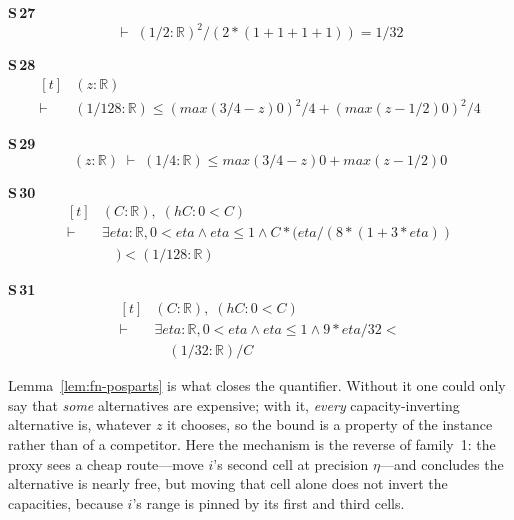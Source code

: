 \noindent\textbf{S\,27}\quad{}
{\footnotesize\[ \vdash\; (1/2 : \mathbb{R} ) ^{2} / (2 * (1 + 1 + 1 + 1)) = 1 / 32 \]}

\noindent\textbf{S\,28}\quad{}
{\footnotesize\[ \begin{aligned}[t]
&(\mathit{z} : \mathbb{R} )\\
\vdash\;&(1/128 : \mathbb{R} ) \leq (\mathit{max} (3/4 - \mathit{z}) 0) ^{2} / 4 + (\mathit{max} (\mathit{z} - 1/2) 0) ^{2} / 4
\end{aligned} \]}

\noindent\textbf{S\,29}\quad{}
{\footnotesize\[ (\mathit{z} : \mathbb{R} ) \;\vdash\; (1/4 : \mathbb{R} ) \leq \mathit{max} (3/4 - \mathit{z}) 0 + \mathit{max} (\mathit{z} - 1/2) 0 \]}

\noindent\textbf{S\,30}\quad{}
{\footnotesize\[ \begin{aligned}[t]
&(\mathit{C} : \mathbb{R} ),\; (\mathit{hC} : 0 < \mathit{C})\\
\vdash\;&\exists \mathit{eta} : \mathbb{R} , 0 < \mathit{eta} \wedge \mathit{eta} \leq 1 \wedge \mathit{C} * (\mathit{eta} / (8 * (1 + 3 * \mathit{eta}))\\
&\quad ) < (1 / 128 : \mathbb{R} )
\end{aligned} \]}

\noindent\textbf{S\,31}\quad{}
{\footnotesize\[ \begin{aligned}[t]
&(\mathit{C} : \mathbb{R} ),\; (\mathit{hC} : 0 < \mathit{C})\\
\vdash\;&\exists \mathit{eta} : \mathbb{R} , 0 < \mathit{eta} \wedge \mathit{eta} \leq 1 \wedge 9 * \mathit{eta} / 32 <\\
&\quad (1 / 32 : \mathbb{R} ) / \mathit{C}
\end{aligned} \]}


Lemma~\ref{lem:fn-posparts} is what closes the quantifier. Without it one could only say that
\emph{some} alternatives are expensive; with it, \emph{every} capacity-inverting alternative
is, whatever $z$ it chooses, so the bound is a property of the instance rather than of a
competitor. Here the mechanism is the reverse of family~1: the proxy sees a cheap route---move
$i$'s second cell at precision $\eta$---and concludes the alternative is nearly free, but
moving that cell alone does not invert the capacities, because $i$'s range is pinned by its
first and third cells.

